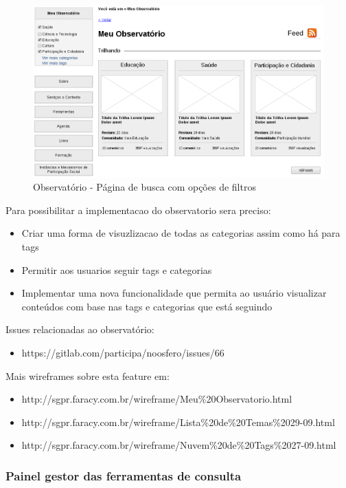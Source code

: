 \documentclass[12pt]{article}
\begin{document}
\begin{figure}[h]
\center
\includegraphics[scale=0.5]{observatorio-wireframe.png}
\caption{Observatório - Página de busca com opções de filtros}
\label{observatorio-wireframe}
\end{figure}

Para possibilitar a implementacao do observatorio sera preciso:
\begin{itemize}
  \item Criar uma forma de visuzlizacao de todas as categorias assim como há para tags
  \item Permitir aos usuarios seguir tags e categorias
  \item Implementar uma nova funcionalidade que permita ao usuário visualizar conteúdos com base nas tags e categorias que está seguindo
\end{itemize}

Issues relacionadas ao observatório:
\begin{itemize}
  \item https://gitlab.com/participa/noosfero/issues/66
\end{itemize}

Mais wireframes sobre esta feature em:

\begin{itemize}
  \item http://sgpr.faracy.com.br/wireframe/Meu\%20Observatorio.html
  \item http://sgpr.faracy.com.br/wireframe/Lista\%20de\%20Temas\%2029-09.html
  \item http://sgpr.faracy.com.br/wireframe/Nuvem\%20de\%20Tags\%2027-09.html
\end{itemize}

\subsubsection{Painel gestor das ferramentas de consulta}
\end{document}
